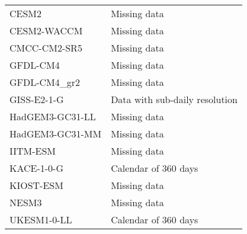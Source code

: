 \begin{table}[h]
\begin{tabular}{ll}
    \hline
    CESM2            & Missing data                   \\
    CESM2-WACCM      & Missing data                   \\
    CMCC-CM2-SR5     & Missing data                   \\
    GFDL-CM4         & Missing data                   \\
    GFDL-CM4\_gr2    & Missing data                   \\
    GISS-E2-1-G      & Data with sub-daily resolution \\
    HadGEM3-GC31-LL  & Missing data                   \\
    HadGEM3-GC31-MM  & Missing data                   \\
    IITM-ESM         & Missing data                   \\
    KACE-1-0-G       & Calendar of 360 days           \\
    KIOST-ESM        & Missing data                   \\
    NESM3            & Missing data                   \\
    UKESM1-0-LL      & Calendar of 360 days
  \end{tabular}
\end{table}
